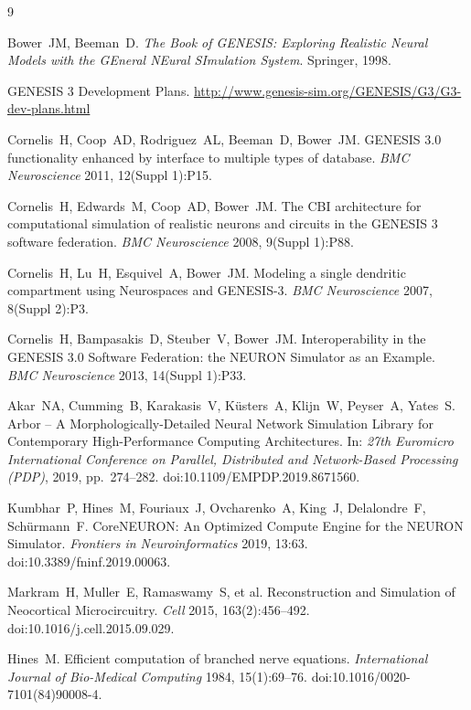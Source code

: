 \documentclass[preprint,12pt, a4paper]{elsarticle}
\begin{document}
\begin{thebibliography}{9}

Bower~JM, Beeman~D.
\textit{The Book of GENESIS: Exploring Realistic Neural Models with the GEneral NEural SImulation System}.
Springer, 1998.

GENESIS 3 Development Plans.
\url{http://www.genesis-sim.org/GENESIS/G3/G3-dev-plans.html}

Cornelis~H, Coop~AD, Rodriguez~AL, Beeman~D, Bower~JM.
GENESIS 3.0 functionality enhanced by interface to multiple types of database.
\textit{BMC Neuroscience} 2011, 12(Suppl 1):P15.

Cornelis~H, Edwards~M, Coop~AD, Bower~JM.
The CBI architecture for computational simulation of realistic neurons and circuits in the GENESIS 3 software federation.
\textit{BMC Neuroscience} 2008, 9(Suppl 1):P88.

Cornelis~H, Lu~H, Esquivel~A, Bower~JM.
Modeling a single dendritic compartment using Neurospaces and GENESIS-3.
\textit{BMC Neuroscience} 2007, 8(Suppl 2):P3.

Cornelis~H, Bampasakis~D, Steuber~V, Bower~JM.
Interoperability in the GENESIS 3.0 Software Federation: the NEURON Simulator as an Example.
\textit{BMC Neuroscience} 2013, 14(Suppl 1):P33.

Akar~NA, Cumming~B, Karakasis~V, K\"usters~A, Klijn~W, Peyser~A, Yates~S.
Arbor -- A Morphologically-Detailed Neural Network Simulation Library for Contemporary High-Performance Computing Architectures.
In: \textit{27th Euromicro International Conference on Parallel, Distributed and Network-Based Processing (PDP)}, 2019, pp.~274--282. doi:10.1109/EMPDP.2019.8671560.

Kumbhar~P, Hines~M, Fouriaux~J, Ovcharenko~A, King~J, Delalondre~F, Sch\"urmann~F.
CoreNEURON: An Optimized Compute Engine for the NEURON Simulator.
\textit{Frontiers in Neuroinformatics} 2019, 13:63. doi:10.3389/fninf.2019.00063.

Markram~H, Muller~E, Ramaswamy~S, et al.
Reconstruction and Simulation of Neocortical Microcircuitry.
\textit{Cell} 2015, 163(2):456--492. doi:10.1016/j.cell.2015.09.029.

Hines~M.
Efficient computation of branched nerve equations.
\textit{International Journal of Bio-Medical Computing} 1984, 15(1):69--76. doi:10.1016/0020-7101(84)90008-4.


\end{thebibliography}
\end{document}
